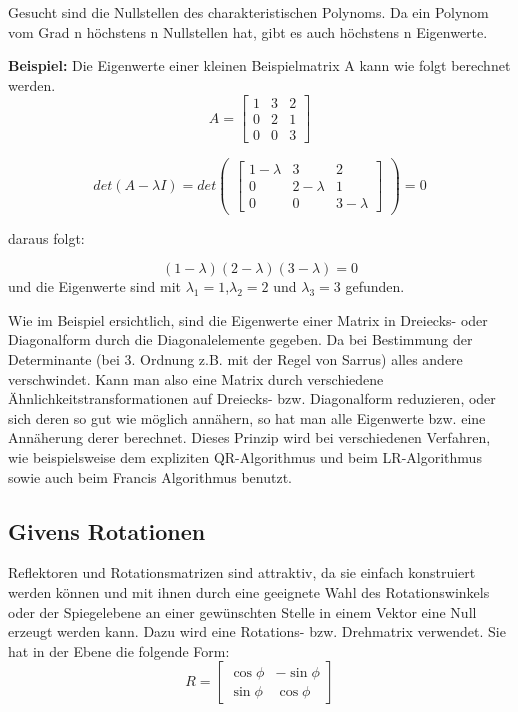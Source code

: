 Gesucht sind die Nullstellen des charakteristischen Polynoms. Da ein Polynom vom Grad n höchstens n Nullstellen hat, gibt es auch höchstens n Eigenwerte.

\textbf{Beispiel:} Die Eigenwerte einer kleinen Beispielmatrix A kann wie folgt berechnet werden.
\begin{equation}
A =
\begin{bmatrix}
1 & 3 & 2 \\
0 & 2 & 1 \\
0 & 0 & 3
\end{bmatrix}
\end{equation}

\begin{equation}
det(A-\lambda I)= det
\begin{pmatrix}
	\begin{bmatrix}
	1-\lambda & 3 & 2 \\
	0 & 2-\lambda & 1 \\
	0 & 0 & 3-\lambda
	\end{bmatrix}
\end{pmatrix}
= 0
\end{equation}

daraus folgt:

\begin{equation} (1-\lambda)(2-\lambda)(3-\lambda)=0\end{equation}
und die Eigenwerte sind mit $\lambda_{1}=1$,$\lambda_{2}=2$ und $\lambda_{3}=3$ gefunden.

Wie im Beispiel ersichtlich, sind die Eigenwerte einer Matrix in Dreiecks- oder Diagonalform durch die Diagonalelemente gegeben.
Da bei Bestimmung der Determinante (bei 3. Ordnung z.B. mit der Regel von Sarrus) alles andere verschwindet.
Kann man also eine Matrix durch verschiedene Ähnlichkeitstransformationen auf Dreiecks- bzw. Diagonalform reduzieren, oder sich deren so gut wie möglich annähern, so hat man alle Eigenwerte bzw. eine Annäherung derer berechnet.
Dieses Prinzip wird bei verschiedenen Verfahren, wie beispielsweise dem expliziten QR-Algorithmus und beim LR-Algorithmus sowie auch beim Francis Algorithmus benutzt.

\subsection{Givens Rotationen\label{francis:section:grundlagen:givens}}
Reflektoren und Rotationsmatrizen sind attraktiv, da sie einfach konstruiert werden können und mit ihnen durch eine geeignete Wahl des Rotationswinkels oder der Spiegelebene an einer gewünschten Stelle in einem Vektor eine Null erzeugt werden kann.
Dazu wird eine Rotations- bzw. Drehmatrix verwendet.
Sie hat in der Ebene die folgende Form:
\begin{equation}
	R=\begin{bmatrix}
	\cos\phi & -\sin\phi \\
	\sin\phi & \cos\phi
	\end{bmatrix}
\end{equation}

